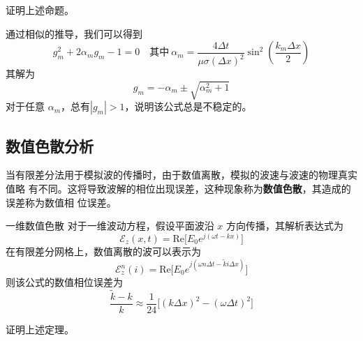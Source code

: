 \begin{exercise}
    证明上述命题。
\end{exercise}

\begin{solution}
    通过相似的推导，我们可以得到
    \begin{equation*}
        g_m^2+2\alpha_m g_m-1=0 \quad \text{其中} 
        \ \alpha_m=\frac{4\Delta t}{\mu \sigma (\Delta x)^2} \sin^2\left(\frac{k_m \Delta x}{2}\right)  
    \end{equation*}
    其解为
    \begin{equation*}
        g_m=-\alpha_m \pm \sqrt{\alpha_m^2+1}
    \end{equation*}
    对于任意 $\alpha_m$，总有$|g_m|>1$，说明该公式总是不稳定的。
\end{solution}

\subsection{数值色散分析}

\par 当有限差分法用于模拟波的传播时，由于数值离散，模拟的波速与波速的物理真实值略
有不同。这将导致波解的相位出现误差，这种现象称为\textbf{数值色散}，其造成的误差称为数值相
位误差。

\begin{theorem}{一维数值色散}
    对于一维波动方程，假设平面波沿 $x$ 方向传播，其解析表达式为
    \begin{equation}
        \mathscr{E}_z(x,t)=\text{Re}\Big[E_0e^{j(\omega t-kx)}\Big]
    \end{equation}
    在有限差分网格上，数值离散的波可以表示为
    \begin{equation}
        \mathscr{E}^n_z(i)=\text{Re}\Big[E_0e^{j(\omega n \Delta t-\tilde{k} i\Delta x)}\Big]
        \label{数值波解}
    \end{equation}
    则该公式的数值相位误差为
    \begin{equation}
        \frac{\tilde{k}-k}{k}
        \approx\frac{1}{24}\Big[(k\Delta x)^2-(\omega \Delta t)^2\Big]
    \end{equation}
\end{theorem}

\begin{exercise}
    证明上述定理。
\end{exercise}

